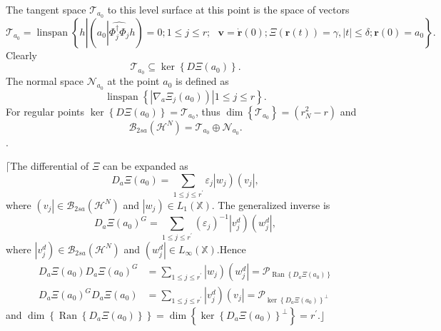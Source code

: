 \documentclass[aps,preprint]{revtex4}%
\begin{document}
The tangent space $\mathcal{T}_{a_{0}}$ to this level surface at this point is
the space of vectors
\begin{equation}
\mathcal{T}_{a_{0}}=\operatorname{linspan}\left\{  h\left\vert \left(
a_{0}\left\vert \widehat{\Phi_{j}^{\dagger}\Phi_{j}}\right.  h\right)
=0\right.  ;1\leq j\leq r;\text{ }\mathbf{v=\dot{r}}\left(  0\right)
;\Xi\left(  \mathbf{r}\left(  t\right)  \right)  =\gamma,\left\vert
t\right\vert \leq\delta;\mathbf{r}\left(  0\right)  =a_{0}\right\}  .
\end{equation}
Clearly
\begin{equation}
\mathcal{T}_{a_{0}}\subseteq\ker\left\{  D\Xi\left(  a_{0}\right)  \right\}  .
\end{equation}
The normal space $\mathcal{N}_{a_{0}}$ at the point $a_{0}$ is defined as
\begin{equation}
\operatorname{linspan}\left\{  \left.  \left\vert \overset{}{\nabla_{a}\Xi
_{j}\left(  a_{0}\right)  }\right)  \right\vert 1\leq j\leq r\right\}  .
\end{equation}
For regular points $\ker\left\{  D\Xi\left(  a_{0}\right)  \right\}
=\mathcal{T}_{a_{0}}$, thus $\dim\left\{  \mathcal{T}_{a_{0}}\right\}
=\left(  r_{N}^{2}-r\right)  $ and
\begin{equation}
\mathcal{B}_{2sa}\left(  \mathcal{H}^{N}\right)  =\mathcal{T}_{a_{0}}%
\oplus\mathcal{N}_{a_{0}}.
\end{equation}
$.$

$\lceil$The differential of $\Xi$ can be expanded as
\begin{equation}
D_{a}\Xi\left(  a_{0}\right)  =\sum\limits_{1\leq j\leq r^{\prime}}%
\varepsilon_{j}\left\vert w_{j}\right)  \left(  v_{j}\right\vert ,
\end{equation}
where $\left(  v_{j}\right\vert \in\mathcal{B}_{2sa}\left(  \mathcal{H}%
^{N}\right)  $ and $\left\vert w_{j}\right)  \in L_{1}\left(  \mathbb{X}%
\right)  .$ The generalized inverse is
\begin{equation}
D_{a}\Xi\left(  a_{0}\right)  ^{G}=\sum\limits_{1\leq j\leq r^{\prime}}\left(
\varepsilon_{j}\right)  ^{-1}\left\vert v_{j}^{d}\right)  \left(  w_{j}%
^{d}\right\vert ,
\end{equation}
where $\left\vert v_{j}^{d}\right)  \in\mathcal{B}_{2sa}\left(  \mathcal{H}%
^{N}\right)  $ and $\left(  w_{j}^{d}\right\vert \in L_{\infty}\left(
\mathbb{X}\right)  .$Hence
\begin{align}
D_{a}\Xi\left(  a_{0}\right)  D_{a}\Xi\left(  a_{0}\right)  ^{G}  &
=\sum\limits_{1\leq j\leq r^{\prime}}\left\vert w_{j}\right)  \left(
w_{j}^{d}\right\vert =\mathcal{P}_{\operatorname{Ran}\left\{  D_{a}\Xi\left(
a_{0}\right)  \right\}  }\\
D_{a}\Xi\left(  a_{0}\right)  ^{G}D_{a}\Xi\left(  a_{0}\right)   &
=\sum\limits_{1\leq j\leq r^{\prime}}\left\vert v_{j}^{d}\right)  \left(
v_{j}\right\vert =\mathcal{P}_{\ker\left\{  D_{a}\Xi\left(  a_{0}\right)
\right\}  ^{\bot}}%
\end{align}
and $\dim\left\{  \operatorname{Ran}\left\{  D_{a}\Xi\left(  a_{0}\right)
\right\}  \right\}  =\dim\left\{  \ker\left\{  D_{a}\Xi\left(  a_{0}\right)
\right\}  ^{\bot}\right\}  =r^{\prime}.\rfloor$
\end{document}

